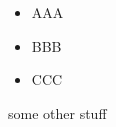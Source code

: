 \documentclass{beamer}
\begin{document}
\begin{frame}
\begin{itemize}[<+->]
\item AAA
\item BBB
\item CCC
\end{itemize}
\end{frame}

\begin{frame}
some other stuff
\end{frame}

\begin{frame}
\usebox{\mybox}
\end{frame}
\end{document}
